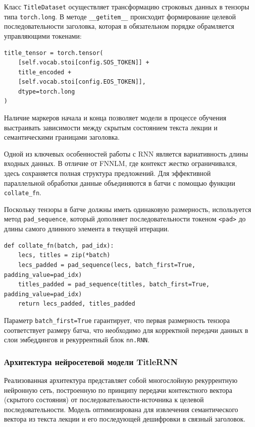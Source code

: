 \documentclass[coursework]{SCWorks}
\begin{document}
    Класс \texttt{TitleDataset} осуществляет трансформацию строковых данных в тензоры типа \texttt{torch.long}. В методе \texttt{\_\_getitem\_\_} происходит формирование целевой последовательности заголовка, которая в обязательном порядке обрамляется управляющими токенами:

    \begin{verbatim}
title_tensor = torch.tensor(
    [self.vocab.stoi[config.SOS_TOKEN]] +
    title_encoded +
    [self.vocab.stoi[config.EOS_TOKEN]],
    dtype=torch.long
)
    \end{verbatim}

    Наличие маркеров начала и конца позволяет модели в процессе обучения выстраивать зависимости между скрытым состоянием текста лекции и семантическими границами заголовка.

    Одной из ключевых особенностей работы с RNN является вариативность длины входных данных. В отличие от FNNLM, где контекст жестко ограничивался, здесь сохраняется полная структура предложений. Для эффективной параллельной обработки данные объединяются в батчи с помощью функции \texttt{collate\_fn}.

    Поскольку тензоры в батче должны иметь одинаковую размерность, используется метод \texttt{pad\_sequence}, который дополняет последовательности токеном \texttt{<pad>} до длины самого длинного элемента в текущей итерации.

    \begin{verbatim}
def collate_fn(batch, pad_idx):
    lecs, titles = zip(*batch)
    lecs_padded = pad_sequence(lecs, batch_first=True, padding_value=pad_idx)
    titles_padded = pad_sequence(titles, batch_first=True, padding_value=pad_idx)
    return lecs_padded, titles_padded
    \end{verbatim}

    Параметр \texttt{batch\_first=True} гарантирует, что первая размерность тензора соответствует размеру батча, что необходимо для корректной передачи данных в слои эмбеддингов и рекуррентный блок \texttt{nn.RNN}.

    \subsubsection{Архитектура нейросетевой модели TitleRNN}

    Реализованная архитектура представляет собой многослойную рекуррентную нейронную сеть, построенную по принципу передачи контекстного вектора (скрытого состояния) от последовательности-источника к целевой последовательности. Модель оптимизирована для извлечения семантического вектора из текста лекции и его последующей дешифровки в связный заголовок.
\end{document}
